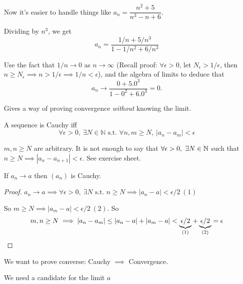 \documentclass[10pt,twoside]{scrartcl}
\begin{document}
\begin{remark}
 Now it's easier to handle things like $a_n = \dfrac{n^2 + 5}{n^3 - n + 6}$.

Dividing by $n^3$, we get \[a_n = \dfrac{1/n + 5/n^3}{1 - 1/n^2 + 6/n^3}\]

 Use the fact that $1/n \to 0$ as $n \to \infty$ (Recall proof: $\forall \epsilon >0$, let $N_\epsilon  > 1/\epsilon$, then $n\geq N_{\epsilon} \implies n > 1/\epsilon \implies 1/n < \epsilon$), and the algebra of limits to deduce that 
\[a_n \to \dfrac{0 + 5.0^3}{1 - 0^2 + 6.0^3} = 0.\]
\end{remark}




Gives a way of proving convergence \emph{without} knowing the limit.\\

\begin{definition}
	A sequence is Cauchy iff
	\[\forall \epsilon >0,~\exists N \in \mathbb{N} \text{ s.t. } \forall n,m \geq N,~ |a_n - a_m| < \epsilon\]
\end{definition}\vspace*{5pt}

\begin{remark}
$m,n \geq N$ are arbitrary. It is not enough to say that $\forall \epsilon >0,~\exists N \in \mathbb{N}$ such that $n \geq N \implies |a_n - a_{n+1}| < \epsilon$. See exercise sheet. 	
\end{remark}

\begin{proposition}	
If $a_n \to a$ then $(a_n)$ is Cauchy. 
\end{proposition}
\begin{proof}
$a_n \to a\implies \forall \epsilon >0,~\exists N \text{ s.t. } n \geq N \implies |a_n - a| < \epsilon/2 ~(1)$


So $m \geq N \implies |a_m - a| < \epsilon /2 ~(2)$. So \[m,n \geq N \implies |a_n - a_m| \leq |a_n - a| + |a_m - a| < \underbrace{\epsilon/2}_{(1)} + \underbrace{\epsilon/2}_{(2)}=\epsilon\qedhere\]
\end{proof}

We want to prove converse: Cauchy $\implies$ Convergence.

We need a candidate for the limit $a$
\end{document}
